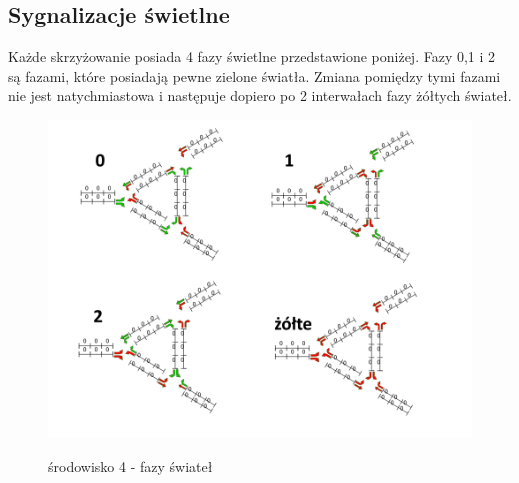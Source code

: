 \documentclass[12pt]{book}
\theoremstyle{plain}
\begin{document}
\subsection{Sygnalizacje świetlne}
Każde skrzyżowanie posiada 4 fazy świetlne przedstawione poniżej. Fazy 0,1 i 2 są fazami, które posiadają pewne zielone światła. Zmiana pomiędzy tymi fazami nie jest natychmiastowa i następuje dopiero po 2 interwałach fazy żółtych świateł.
\begin{figure}[H]
	\centering
	\includegraphics[width=14cm]{env_4_fazy}
	\label{fig:env_4_fazy}
	\caption{środowisko 4 - fazy świateł}
\end{figure}
\end{document}
